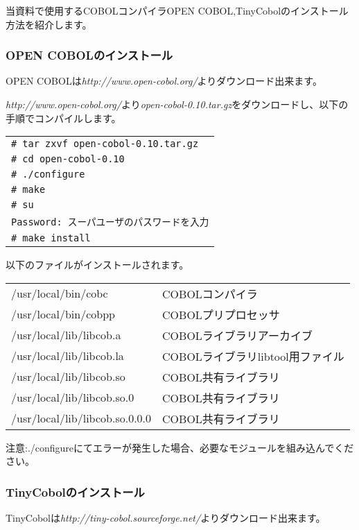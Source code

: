 当資料で使用するCOBOLコンパイラOPEN COBOL,TinyCobolのインストール方法を紹介します。

\subsubsection{OPEN COBOLのインストール}

OPEN COBOLは{\it http://www.open-cobol.org/}よりダウンロード出来ます。

{\it http://www.open-cobol.org/}より{\it open-cobol-0.10.tar.gz}をダウンロードし、以下の手順でコンパイルします。

\begin{tabular}{|l|}
\hline
\verb+# tar zxvf open-cobol-0.10.tar.gz+\\
\verb+# cd open-cobol-0.10+\\
\verb+# ./configure+\\
\verb+# make+\\
\verb+# su+\\
\verb+Password: スーパユーザのパスワードを入力+\\
\verb+# make install+\\
\hline
\end{tabular}

以下のファイルがインストールされます。

\begin{tabular}{ll}
/usr/local/bin/cobc           &COBOLコンパイラ\\
/usr/local/bin/cobpp          &COBOLプリプロセッサ\\
/usr/local/lib/libcob.a       &COBOLライブラリアーカイブ \\
/usr/local/lib/libcob.la      &COBOLライブラリlibtool用ファイル\\
/usr/local/lib/libcob.so      &COBOL共有ライブラリ\\
/usr/local/lib/libcob.so.0    &COBOL共有ライブラリ\\
/usr/local/lib/libcob.so.0.0.0&COBOL共有ライブラリ\\
\end{tabular}

注意:./configureにてエラーが発生した場合、必要なモジュールを組み込んでください。

\subsubsection{TinyCobolのインストール}

TinyCobolは{\it http://tiny-cobol.sourceforge.net/}よりダウンロード出来ます。

